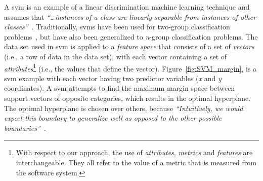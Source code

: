 A \gls{svm} is an example of a linear discrimination machine learning technique and assumes that \emph{``\ldots instances of a class are linearly separable from instances of other classes''}~\cite{ALP04}. Traditionally, \gls{svm}s have been used for two-group classification problems~\cite{CV95}, but have also been generalized to \emph{n}-group classification problems. The data set used in \gls{svm} is applied to a \emph{feature space} that consists of a set of \emph{vectors} (i.e., a row of data in the data set), with each vector containing a set of \emph{attributes}\footnote{With respect to our approach, the use of \emph{attributes}, \emph{metrics} and \emph{features} are interchangeable. They all refer to the value of a metric that is measured from the software system.} (i.e., the values that define the vector). Figure~\ref{fig:SVM_margin}, is a \gls{svm} example with each vector having two predictor variables (\emph{x} and \emph{y} coordinates). A \gls{svm} attempts to find the maximum margin space between support vectors of opposite categories, which results in the optimal hyperplane. The optimal hyperplane is chosen over others, because \emph{``Intuitively, we would expect this boundary to generalize well as opposed to the other possible boundaries''}~\cite{Gun98}.

